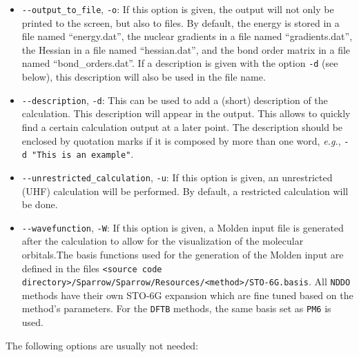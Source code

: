 \documentclass[]{tufte-book}
\begin{document}
\begin{itemize}
\item \texttt{-{}-output\_to\_file}, \texttt{-o}: If this option is given, the output will not only be printed to the screen, 
but also to files. By default, the energy is stored in a file named ``energy.dat'', the nuclear gradients in a file named
``gradients.dat'', the Hessian in a file named ``hessian.dat'', and the bond order matrix in a file named ``bond\_orders.dat''.
If a description is given with the option \texttt{-d} (see below), this description will also be used in the file name.
\item \texttt{-{}-description}, \texttt{-d}: This can be used to add a (short) description of the calculation. This
description will appear in the output. This allows to quickly find a certain calculation output at a later point. The
description should be enclosed by quotation marks if it is composed by more than one word, \textit{e.g.},
\texttt{-d "This is an example"}.
\item \texttt{-{}-unrestricted\_calculation}, \texttt{-u}: If this option is given, an unrestricted (UHF) calculation
will be performed. By default, a restricted calculation will be done.
\item \texttt{-{}-wavefunction}, \texttt{-W}: If this option is given, a Molden input file is generated after the
calculation to allow for the visualization of the molecular orbitals.The basis functions used for the generation of the
Molden input are defined in the files \texttt{<source code directory>/Sparrow/Sparrow/Resources/<method>/STO-6G.basis}.
All \texttt{NDDO} methods have their own STO-6G expansion which are fine tuned based on the method's parameters.
For the \texttt{DFTB} methods, the same basis set as \texttt{PM6} is used.

\end{itemize}

The following options are usually not needed:
\end{document}
